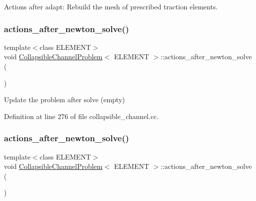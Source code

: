 Actions after adapt\+: Rebuild the mesh of prescribed traction elements. 

\mbox{\label{classCollapsibleChannelProblem_a34299672cba0f3c1db3901427eb4da4a}} 
\subsubsection{\texorpdfstring{actions\+\_\+after\+\_\+newton\+\_\+solve()}{actions\_after\_newton\_solve()}\hspace{0.1cm}{\footnotesize\ttfamily [1/2]}}
{\footnotesize\ttfamily template$<$class E\+L\+E\+M\+E\+NT$>$ \\
void \hyperlink{classCollapsibleChannelProblem}{Collapsible\+Channel\+Problem}$<$ E\+L\+E\+M\+E\+NT $>$\+::actions\+\_\+after\+\_\+newton\+\_\+solve (\begin{DoxyParamCaption}{ }\end{DoxyParamCaption})\hspace{0.3cm}{\ttfamily [inline]}}



Update the problem after solve (empty) 



Definition at line 276 of file collapsible\+\_\+channel.\+cc.

\mbox{\label{classCollapsibleChannelProblem_a34299672cba0f3c1db3901427eb4da4a}} 
\subsubsection{\texorpdfstring{actions\+\_\+after\+\_\+newton\+\_\+solve()}{actions\_after\_newton\_solve()}\hspace{0.1cm}{\footnotesize\ttfamily [2/2]}}
{\footnotesize\ttfamily template$<$class E\+L\+E\+M\+E\+NT$>$ \\
void \hyperlink{classCollapsibleChannelProblem}{Collapsible\+Channel\+Problem}$<$ E\+L\+E\+M\+E\+NT $>$\+::actions\+\_\+after\+\_\+newton\+\_\+solve (\begin{DoxyParamCaption}{ }\end{DoxyParamCaption})\hspace{0.3cm}{\ttfamily [inline]}}



